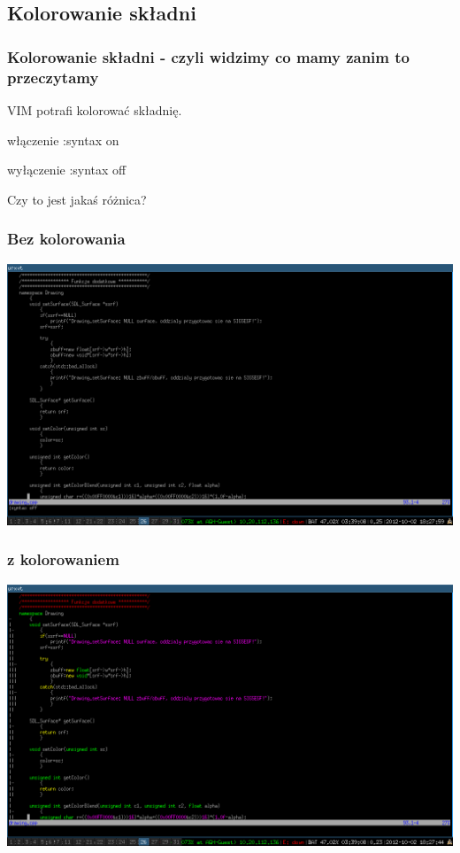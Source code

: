 \documentclass{beamer}
\begin{document}
\subsection{Kolorowanie składni}
\begin{frame}
	\frametitle{Kolorowanie składni - czyli widzimy co mamy zanim to przeczytamy}
	{
		VIM potrafi kolorować składnię.
	}
	\uncover<2->
	{
		\begin{block}{włączenie}
		:syntax on
		\end{block}
	}
	{
		\begin{block}{wyłączenie}
		:syntax off
		\end{block}
	}
	{
		Czy to jest jakaś różnica?
	}
\end{frame}
\begin{frame}
	\frametitle{Bez kolorowania}
	\includegraphics[width=\textwidth]{syntax_off.png}
\end{frame}
\begin{frame}
	\frametitle{z kolorowaniem}
	\includegraphics[width=\textwidth]{syntax_on.png}
\end{frame}
\end{document}
